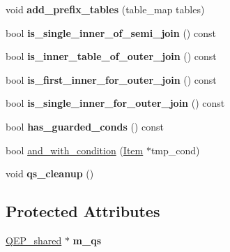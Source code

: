 \begin{DoxyCompactItemize}
\item 
\mbox{\label{classQEP__shared__owner_ae49fdb92da60f6370a2e5a0c1d4ece69}} 
void {\bfseries add\+\_\+prefix\+\_\+tables} (table\+\_\+map tables)
\item 
\mbox{\label{classQEP__shared__owner_a4048e1cf46e2483f3634992a24fb4c9e}} 
bool {\bfseries is\+\_\+single\+\_\+inner\+\_\+of\+\_\+semi\+\_\+join} () const
\item 
\mbox{\label{classQEP__shared__owner_a7751b33fb50de39014d255a086edabf3}} 
bool {\bfseries is\+\_\+inner\+\_\+table\+\_\+of\+\_\+outer\+\_\+join} () const
\item 
\mbox{\label{classQEP__shared__owner_a2eb8d85a1a3f565fd78231151ae77fad}} 
bool {\bfseries is\+\_\+first\+\_\+inner\+\_\+for\+\_\+outer\+\_\+join} () const
\item 
\mbox{\label{classQEP__shared__owner_a1ba13cac3c2b48cbe9db8652cc7e48de}} 
bool {\bfseries is\+\_\+single\+\_\+inner\+\_\+for\+\_\+outer\+\_\+join} () const
\item 
\mbox{\label{classQEP__shared__owner_a951d20d285c4803a436843846a3743c8}} 
bool {\bfseries has\+\_\+guarded\+\_\+conds} () const
\item 
bool \mbox{\hyperlink{group__Query__Optimizer_ga2d28b10dac195744ef3daaab70d84208}{and\+\_\+with\+\_\+condition}} (\mbox{\hyperlink{classItem}{Item}} $\ast$tmp\+\_\+cond)
\item 
void {\bfseries qs\+\_\+cleanup} ()
\end{DoxyCompactItemize}
\subsection*{Protected Attributes}
\begin{DoxyCompactItemize}
\item 
\mbox{\label{classQEP__shared__owner_a1b91beba37b4c5ef7c0a2365d6e2ef5d}} 
\mbox{\hyperlink{classQEP__shared}{Q\+E\+P\+\_\+shared}} $\ast$ {\bfseries m\+\_\+qs}
\end{DoxyCompactItemize}


